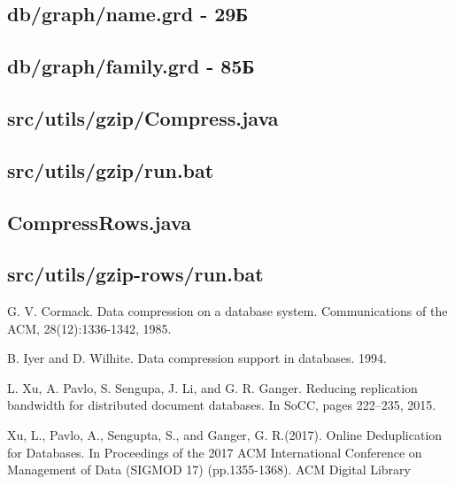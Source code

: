 \documentclass[12pt,a4paper]{article}
\begin{document}
\subsection{db/graph/name.grd - 29Б}


\subsection{db/graph/family.grd - 85Б}


\subsection{src/utils/gzip/Compress.java}


\subsection{src/utils/gzip/run.bat}


\subsection{CompressRows.java}


\subsection{src/utils/gzip-rows/run.bat}


\begin{thebibliography}{9} 
     G. V. Cormack. Data compression on a database system. Communications of the ACM, 28(12):1336-1342, 1985.

     B. Iyer and D. Wilhite. Data compression support in databases. 1994.

     L. Xu, A. Pavlo, S. Sengupa, J. Li, and G. R. Ganger.
Reducing replication bandwidth for distributed document
databases. In SoCC, pages 222–235, 2015.

   Xu, L., Pavlo, A., Sengupta, S., and Ganger, G. R.(2017). Online Deduplication for Databases. In Proceedings of the 2017 ACM International Conference on Management of Data (SIGMOD 17) (pp.1355-1368). ACM Digital Library

\end{thebibliography}
\end{document}
